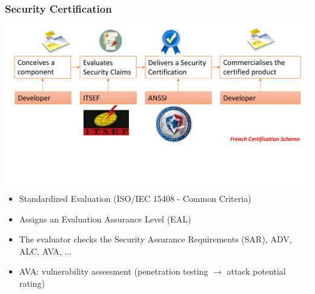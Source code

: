 \begin{frame}
\frametitle{Security Certification}
\centering
\includegraphics[width = .9\textwidth]{figures/ITSEF_nobody.pdf}
\begin{itemize}
\item Standardized Evaluation (\eg ISO/IEC 15408 - Common Criteria)
\item Assigns an Evaluation Assurance Level (EAL)
\item The evaluator checks the Security Assurance Requirements (SAR), \eg ADV, ALC, AVA, ...
\item AVA: vulnerability assessment (penetration testing $\rightarrow$ attack potential rating)
\end{itemize}
\end{frame}

